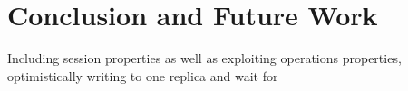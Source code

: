 
\section{Conclusion and Future Work}

Including session properties as well as exploiting operations properties, optimistically writing to one replica and wait for 

